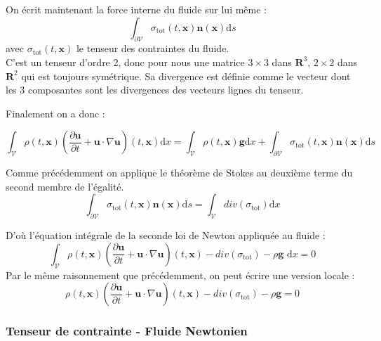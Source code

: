 On écrit maintenant la force interne du fluide sur lui même : 
\begin{equation}
\int_{\partial \mathcal{V}} \sigma_{\mathrm{tot}}(t, \mathbf{x}) \mathbf{n}(\mathbf{x}) \mathrm{d} s
\end{equation}
avec $\sigma_{\mathrm{tot}}(t, \mathbf{x})$ le tenseur des contraintes du fluide.\\ C'est un tenseur d'ordre 2, donc pour nous une matrice $3\times3$ dans $\mathbf{R}^3$, $2\times2$ dans $\mathbf{R}^2$ qui est toujours symétrique.
Sa divergence est définie comme le vecteur dont les 3 composantes sont les divergences des vecteurs lignes du tenseur.

Finalement on a donc : 

\begin{equation}
\int_{\mathcal{V}} \rho(t, \mathbf{x})\left(\frac{\partial \mathbf{u}}{\partial t}+\mathbf{u} \cdot \nabla \mathbf{u}\right)(t, \mathbf{x}) \mathrm{d} x=\int_{\mathcal{V}} \rho(t, \mathbf{x}) \mathbf{g} \mathrm{d} x+\int_{\partial \mathcal{V}} \sigma_{\mathrm{tot}}(t, \mathbf{x}) \mathbf{n}(\mathbf{x}) \mathrm{d} s
\end{equation}

Comme précédemment on applique le théorème de Stokes au deuxième terme du second membre de l'égalité.
\[\int_{\partial \mathcal{V}} \sigma_{\mathrm{tot}}(t, \mathbf{x}) \mathbf{n}(\mathbf{x}) \mathrm{d} s  = \int_{\mathcal{V}} div(\sigma_{\mathrm{tot}}) \mathrm{d} x \]

D'où l'équation intégrale de la seconde loi de Newton appliquée au fluide : 
\begin{equation}
\int_{\mathcal{V}} \rho(t, \mathbf{x})\left(\frac{\partial \mathbf{u}}{\partial t}+\mathbf{u} \cdot \nabla \mathbf{u}\right)(t, \mathbf{x}) - div(\sigma_{\mathrm{tot}}) - \rho \mathbf{g} \, \, \mathrm{d} x = 0
\end{equation}
Par le même raisonnement que précédemment, on peut écrire une version locale :
 \begin{equation}\label{PreNav}
\rho(t, \mathbf{x})\left(\frac{\partial \mathbf{u}}{\partial t}+\mathbf{u} \cdot \nabla \mathbf{u}\right)(t, \mathbf{x}) - div(\sigma_{\mathrm{tot}}) - \rho \mathbf{g}  = 0
\end{equation}

\subsubsection{Tenseur de contrainte - Fluide Newtonien}

